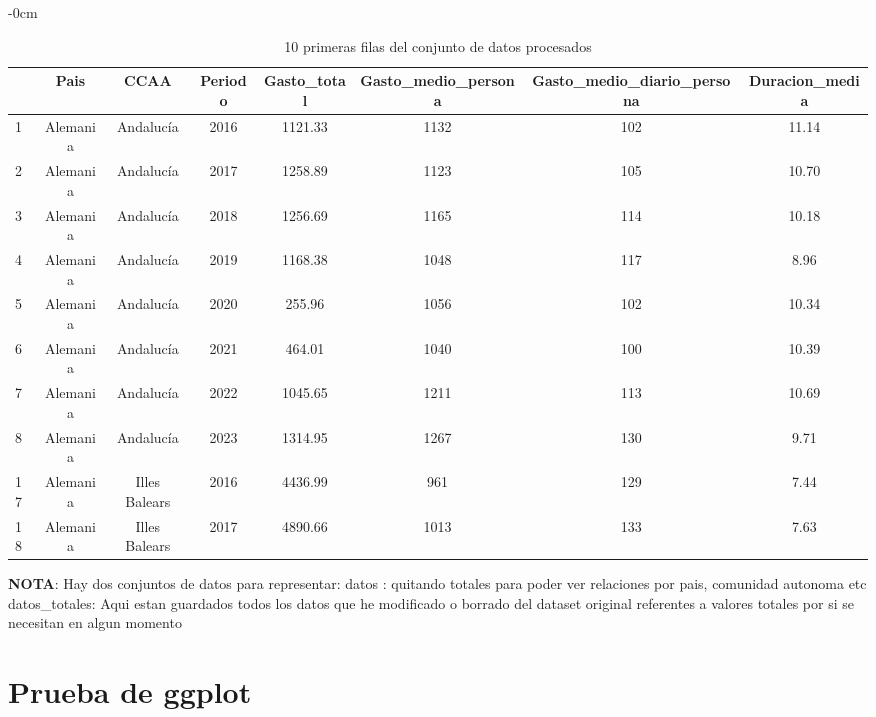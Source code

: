 \documentclass[data,article,submit,moreauthors,pdftex]{Definitions/mdpi}
\begin{document}
\begin{table}[H]

\caption{\label{tab:unnamed-chunk-27} 10 primeras filas del conjunto de datos procesados}
             \begin{adjustwidth}{-\extralength}{0cm}
             \small
\begin{tabular}[t]{lccccccc}
\toprule
  & Pais & CCAA & Periodo & Gasto\_total & Gasto\_medio\_persona & Gasto\_medio\_diario\_persona & Duracion\_media\\
\midrule
1 & Alemania & Andalucía & 2016 & 1121.33 & 1132 & 102 & 11.14\\
2 & Alemania & Andalucía & 2017 & 1258.89 & 1123 & 105 & 10.70\\
3 & Alemania & Andalucía & 2018 & 1256.69 & 1165 & 114 & 10.18\\
4 & Alemania & Andalucía & 2019 & 1168.38 & 1048 & 117 & 8.96\\
5 & Alemania & Andalucía & 2020 & 255.96 & 1056 & 102 & 10.34\\
6 & Alemania & Andalucía & 2021 & 464.01 & 1040 & 100 & 10.39\\
7 & Alemania & Andalucía & 2022 & 1045.65 & 1211 & 113 & 10.69\\
8 & Alemania & Andalucía & 2023 & 1314.95 & 1267 & 130 & 9.71\\
17 & Alemania & Illes Balears & 2016 & 4436.99 & 961 & 129 & 7.44\\
18 & Alemania & Illes Balears & 2017 & 4890.66 & 1013 & 133 & 7.63\\
\bottomrule
\end{tabular}
    \end{adjustwidth}
\end{table}

\textbf{NOTA}: Hay dos conjuntos de datos para representar: datos :
quitando totales para poder ver relaciones por pais, comunidad autonoma
etc datos\_totales: Aqui estan guardados todos los datos que he
modificado o borrado del dataset original referentes a valores totales
por si se necesitan en algun momento

\hypertarget{prueba-de-ggplot}{%
\section{Prueba de ggplot}\label{prueba-de-ggplot}}
\end{document}
